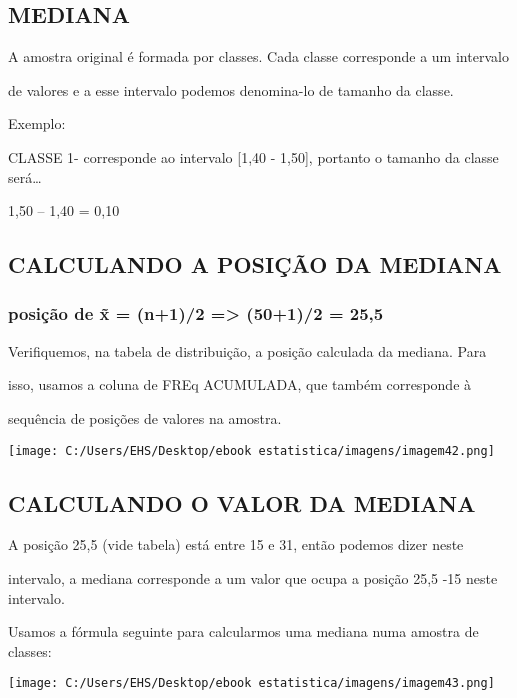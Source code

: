 \documentclass[]{book}
\begin{document}
\hypertarget{mediana}{%
\subsection{MEDIANA}\label{mediana}}

A amostra original é formada por classes. Cada classe corresponde a um intervalo

de valores e a esse intervalo podemos denomina-lo de tamanho da classe.

Exemplo:

CLASSE 1- corresponde ao intervalo {[}1,40 - 1,50{]}, portanto o tamanho da classe será\ldots{}

1,50 -- 1,40 = 0,10

\hypertarget{calculando-a-posicao-da-mediana}{%
\subsection{CALCULANDO A POSIÇÃO DA MEDIANA}\label{calculando-a-posicao-da-mediana}}

\hypertarget{posicao-de-x-n12-5012-255}{%
\subsubsection{posição de x̃ = (n+1)/2 =\textgreater{} (50+1)/2 = 25,5}\label{posicao-de-x-n12-5012-255}}

Verifiquemos, na tabela de distribuição, a posição calculada da mediana. Para

isso, usamos a coluna de FREq ACUMULADA, que também corresponde à

sequência de posições de valores na amostra.

\texttt{[image: C:/Users/EHS/Desktop/ebook estatistica/imagens/imagem42.png]}

\hypertarget{calculando-o-valor-da-mediana}{%
\subsection{CALCULANDO O VALOR DA MEDIANA}\label{calculando-o-valor-da-mediana}}

A posição 25,5 (vide tabela) está entre 15 e 31, então podemos dizer neste

intervalo, a mediana corresponde a um valor que ocupa a posição 25,5 -15 neste intervalo.

Usamos a fórmula seguinte para calcularmos uma mediana numa amostra de classes:

\texttt{[image: C:/Users/EHS/Desktop/ebook estatistica/imagens/imagem43.png]}
\end{document}
